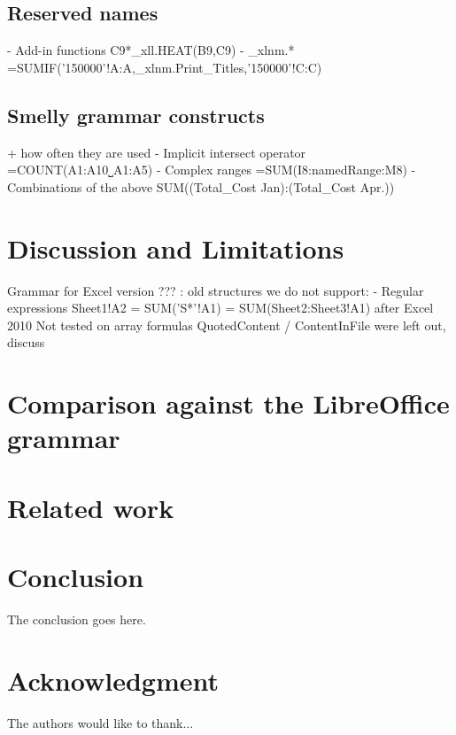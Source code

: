 \documentclass[conference]{IEEEtran}
\begin{document}
\subsection{Reserved names}
- Add-in functions C9*\_xll.HEAT(B9,C9)
- \_xlnm.* =SUMIF('150000'!A:A,\_xlnm.Print\_Titles,'150000'!C:C)


\subsection{Smelly grammar constructs}
 + how often they are used
- Implicit intersect operator =COUNT(A1:A10˽A1:A5)
- Complex ranges =SUM(I8:namedRange:M8)
- Combinations of the above SUM((Total\_Cost Jan):(Total\_Cost Apr.))

\section{Discussion and Limitations}
Grammar for Excel version ??? : old structures we do not support:
- Regular expressions Sheet1!A2 = SUM('S*'!A1) = SUM(Sheet2:Sheet3!A1) after Excel 2010
Not tested on array formulas
QuotedContent / ContentInFile were left out, discuss

\section{Comparison against the LibreOffice grammar}

\section{Related work}

\section{Conclusion}
The conclusion goes here.


\section*{Acknowledgment}
The authors would like to thank...




\end{document}
